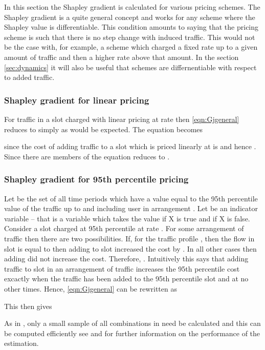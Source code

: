 In this section the Shapley gradient is calculated for various
pricing schemes.  The Shapley gradient is a quite general
concept and works for any scheme where the Shapley value
is differentiable.  This condition amounts to saying that the
pricing scheme is such that there is no step change with
induced traffic.  This would not be the case with, for example,
a scheme which charged a fixed rate up to a given amount of
traffic and then a higher rate above that amount.
In the section \ref{sec:dynamics} it will also be useful
that schemes are differnentiable with respect to added traffic.

\subsubsection{Shapley gradient for linear pricing}
\label{sec:linear_price}

For traffic in a slot  charged with 
linear pricing at rate  then 
\eqref{eqn:Gjgeneral} reduces to simply  as
would be expected.  
The equation becomes 

since the cost of adding  traffic to a slot  which
is priced linearly at  is  and hence
.
Since there are
 members of  the equation reduces
to .  

\subsubsection{Shapley gradient for 95th percentile pricing}
\label{sec:shap95}

Let  be the set of all
time periods which have a value equal to the 95th percentile value
of the traffic up to and including user  in arrangement .
Let  be an indicator variable -- that is a variable which takes
the value  if X is true and  if X is false.
Consider a slot  charged at
95th percentile at rate .  
For some arrangement of traffic  then there are two
possibilities.  If, for the traffic profile , then 
the flow in slot  is equal to  then adding  to
slot  increased the cost by .  In all other cases
then adding  did not increase the cost.  Therefore,
.
Intuitively this says that adding traffic  to slot  in
an arrangement of traffic increases the 95th percentile 
cost excactly when the traffic has been added to the 95th percentile
slot and at no other times.
Hence,  
\eqref{eqn:Gjgeneral} can be rewritten as
 
This then gives

As in \cite{stanojevic2010heavy}, only a small sample
of all combinations in  need be calculated and
this can be computed efficiently see \cite{stanojevic2010heavy}
and \cite{lakhina_cost_2012} for further information on the
performance of the estimation.

